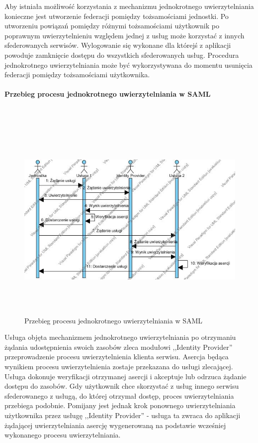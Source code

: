 			Aby istniała możliwość korzystania z mechanizmu jednokrotnego uwierzytelniania konieczne jest utworzenie federacji pomiędzy tożsamościami jednostki. Po utworzeniu powiązań pomiędzy różnymi tożsamościami użytkownik po poprawnym uwierzytelnieniu względem jednej z usług może korzystać z innych sfederowanych serwisów. Wylogowanie się wykonane dla którejś z aplikacji powoduje zamknięcie dostępu do wszystkich sfederowanych usług. Procedura jednokrotnego uwierzytelniania może być wykorzystywana do momentu usunięcia federacji pomiędzy tożsamościami użytkownika.

		\paragraph{Przebieg procesu jednokrotnego uwierzytelniania w SAML}\mbox{}\\

			\begin{figure}[h]
				\centering
					\includegraphics[width=15cm,height=10cm]{img/ssoSteps.jpg}
				\caption{Przebieg procesu jednokrotnego uwierzytelniania w SAML}
				\label{Przebieg procesu jednokrotnego uwierzytelniania w SAML}
			\end{figure}

			Usługa objęta mechanizmem jednokrotnego uwierzytelniania po otrzymaniu żądania udostępnienia swoich zasobów zleca modułowi ,,Identity Provider'' przeprowadzenie procesu uwierzytelnienia klienta serwisu. Asercja będąca wynikiem procesu uwierzytelnienia zostaje przekazana do usługi zlecającej. Usługa dokonuje weryfikacji otrzymanej asercji i akceptuje lub odrzuca żądanie dostępu do zasobów. Gdy użytkownik chce skorzystać z usług innego serwisu sfederowanego z usługą, do której otrzymał dostęp, proces uwierzytelniania przebiega podobnie. Pomijany jest jednak krok ponownego uwierzytelniania użytkownika przez usługę ,,Identity Provider'' - usługa ta zwraca do aplikacji żądającej uwierzytelniania asercję wygenerowaną na podstawie wcześniej wykonanego procesu uwierzytelniania.	
			
